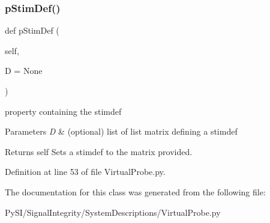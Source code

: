 \subsubsection{\texorpdfstring{p\+Stim\+Def()}{pStimDef()}}
{\footnotesize\ttfamily def p\+Stim\+Def (\begin{DoxyParamCaption}\item[{}]{self,  }\item[{}]{D = {\ttfamily None} }\end{DoxyParamCaption})}



property containing the stimdef 


\begin{DoxyParams}{Parameters}
{\em D} & (optional) list of list matrix defining a stimdef \\
\hline
\end{DoxyParams}
\begin{DoxyReturn}{Returns}
self Sets a stimdef to the matrix provided. 
\end{DoxyReturn}


Definition at line 53 of file Virtual\+Probe.\+py.



The documentation for this class was generated from the following file\+:\begin{DoxyCompactItemize}
\item 
Py\+S\+I/\+Signal\+Integrity/\+System\+Descriptions/Virtual\+Probe.\+py\end{DoxyCompactItemize}
